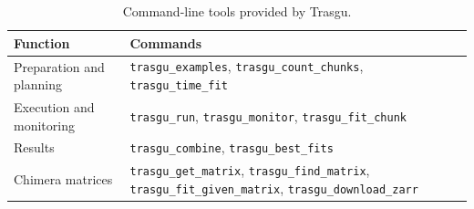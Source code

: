 \documentclass[preprint,12pt, a4paper]{elsarticle}
\begin{document}
\begin{table}[htbp]
\centering
\caption{Command-line tools provided by Trasgu.}
\label{tab:commands}
\begin{tabular}{
  @{}
  >{\raggedright\arraybackslash}p{}
  >{\raggedright\arraybackslash}p{}
  @{}
}
\toprule
\textbf{Function} & \textbf{Commands} \\
\midrule

Preparation and planning
& \texttt{trasgu\_examples}, \texttt{trasgu\_count\_chunks},
  \texttt{trasgu\_time\_fit} \\

Execution and monitoring
& \texttt{trasgu\_run}, \texttt{trasgu\_monitor},
  \texttt{trasgu\_fit\_chunk} \\

Results
& \texttt{trasgu\_combine}, \texttt{trasgu\_best\_fits} \\

Chimera matrices
& \texttt{trasgu\_get\_matrix}, \texttt{trasgu\_find\_matrix},
  \texttt{trasgu\_fit\_given\_matrix},
  \texttt{trasgu\_download\_zarr} \\

\bottomrule
\end{tabular}
\end{table}




\end{document}
